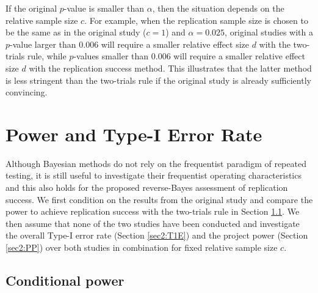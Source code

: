 If the original $p$-value is smaller than $\alpha$, then the situation depends
on the relative sample size $c$. For example, when the replication sample size
is chosen to be the same as in the original study ($c=1$) and $\alpha=0.025$,
original studies with a $p$-value larger than $0.006$ will require a smaller
relative effect size $d$ with the two-trials rule, while $p$-values smaller than
$0.006$ will require a smaller relative effect size $d$ with the replication
success method. This illustrates that the latter method is less stringent than
the two-trials rule if the original study is already sufficiently convincing.

\section{Power and Type-I Error Rate}\label{sec2:ER}
Although Bayesian methods do not rely on the frequentist paradigm of repeated
testing, it is still useful to investigate their frequentist operating
characteristics \citep{Dawid1982, Rubin1984, Grieve2016} and this also holds for
the proposed reverse-Bayes assessment of replication success. We first condition
on the results from the original study and compare the power to achieve
replication success with the two-trials rule in Section \ref{sec2:powerrep}. We
then assume that none of the two studies have been conducted and investigate the
overall Type-I error rate (Section \ref{sec2:T1E}) and the project power (Section
\ref{sec2:PP}) \citep{Maca2002} over both studies in combination for fixed
relative sample size $c$.

\subsection{Conditional power}\label{sec2:powerrep}


